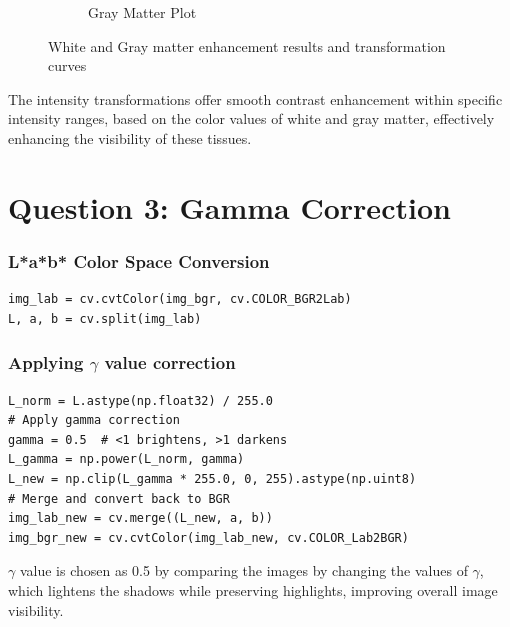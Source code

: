 \documentclass[11pt]{article}
\begin{document}
\begin{figure}[H]
\begin{subfigure}{0.26\textwidth}
        \caption{Gray Matter Plot}
    \end{subfigure}
    \caption{White and Gray matter enhancement results and transformation curves}
\end{figure}
The intensity transformations offer smooth contrast enhancement within specific intensity ranges, based on the color values of white and gray matter, effectively enhancing the visibility of these tissues.

\section*{Question 3: Gamma Correction}
\subsubsection*{L*a*b* Color Space Conversion}
\begin{lstlisting}[style=pythonstyle]
img_lab = cv.cvtColor(img_bgr, cv.COLOR_BGR2Lab)
L, a, b = cv.split(img_lab)
\end{lstlisting}
\subsubsection*{Applying $\gamma$ value correction}
\begin{lstlisting}[style=pythonstyle]
L_norm = L.astype(np.float32) / 255.0  
# Apply gamma correction
gamma = 0.5  # <1 brightens, >1 darkens
L_gamma = np.power(L_norm, gamma)
L_new = np.clip(L_gamma * 255.0, 0, 255).astype(np.uint8)
# Merge and convert back to BGR
img_lab_new = cv.merge((L_new, a, b))
img_bgr_new = cv.cvtColor(img_lab_new, cv.COLOR_Lab2BGR)
\end{lstlisting}
$\gamma$ value is chosen as 0.5 by comparing the images by changing the values of $\gamma$, which lightens the shadows while preserving highlights, improving overall image visibility.
\end{document}
